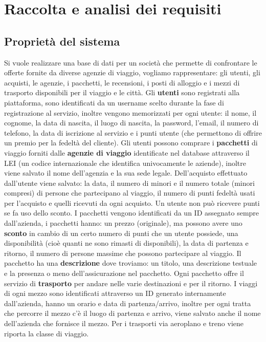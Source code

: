 \section{Raccolta e analisi dei requisiti}
\subsection{Proprietà del sistema}
%
%
Si vuole realizzare una base di dati per un società che permette di confrontare le offerte fornite da diverse agenzie di viaggio, vogliamo rappresentare: gli utenti, gli acquisti, le agenzie, i pacchetti, le recensioni, i posti di alloggio e i mezzi di trasporto disponibili per il viaggio e le città.
%
%
Gli \textbf{utenti} sono registrati alla piattaforma, sono identificati da un username scelto durante la fase di registrazione al servizio, inoltre vengono memorizzati per ogni utente: il nome, il cognome, la data di nascita, il luogo di nascita, la password, l'email, il numero di telefono, la data di iscrizione al servizio e i punti utente (che permettono di offrire un premio per la fedeltà del cliente). %
%
Gli utenti possono comprare i \textbf{pacchetti} di viaggio forniti dalle \textbf{agenzie di viaggio} identificate nel database attraverso il LEI (un codice internazionale che identifica univocamente le aziende), inoltre viene salvato il nome dell'agenzia e la sua sede legale. Dell'acquisto effettuato dall'utente viene salvato: la data, il numero di minori e il numero totale (minori compresi) di persone che partecipano al viaggio, il numero di punti fedeltà usati per l'acquisto e quelli ricevuti da ogni acquisto. Un utente non può ricevere punti se fa uso dello sconto.
%
I pacchetti vengono identificati da un ID assegnato sempre dall'azienda, i pacchetti hanno: un prezzo (originale), ma possono avere uno \textbf{sconto} in cambio di un certo numero di punti che un utente possiede, una disponibilità (cioè quanti ne sono rimasti di disponibili), la data di partenza e ritorno, il numero di persone massime che possono partecipare al viaggio.
%
Il pacchetto ha una \textbf{descrizione} dove troviamo: un titolo, una descrizione testuale e la presenza o meno dell'assicurazione nel pacchetto.
%
Ogni pacchetto offre il servizio di \textbf{trasporto} per andare nelle varie destinazioni e per il ritorno. I viaggi di ogni mezzo sono identificati attraverso un ID generato internamente dall'azienda, hanno un orario e data di partenza/arrivo, inoltre per ogni tratta che percorre il mezzo c'è il luogo di partenza e arrivo, viene salvato anche il nome dell'azienda che fornisce il mezzo. Per i trasporti via aeroplano e treno viene riporta la classe di viaggio.
